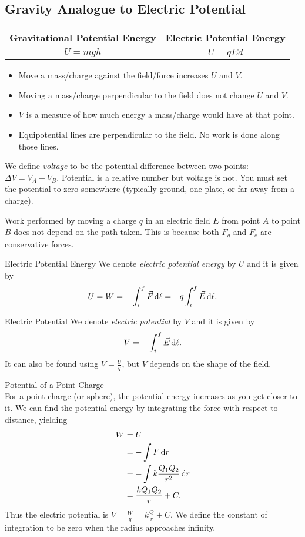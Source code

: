 \documentclass[class=article, crop=false]{standalone}
\begin{document}
  \subsection{Gravity Analogue to Electric Potential}
  \begin{center}\begin{tabular}{c|c}
    Gravitational Potential Energy & Electric Potential Energy \\
    \hline
    $U = mgh$ & $U = qEd$
  \end{tabular}\end{center}
  \begin{itemize}
    \item Move a mass/charge against the field/force increases $U$ and $V$.
    \item Moving a mass/charge perpendicular to the field does not change $U$ and $V$.
    \item $V$ is a measure of how much energy a mass/charge would have at that point.
    \item Equipotential lines are perpendicular to the field. No work is done along those lines.
  \end{itemize}
  We define \emph{voltage} to be the potential difference between two points: $\Delta V = V_A - V_B$. Potential is a relative number but voltage is not. You must set the potential to zero somewhere (typically ground, one plate, or far away from a charge).
  \begin{note}{}
    Work performed by moving a charge $q$ in an electric field $E$ from point $A$ to point $B$ does not depend on the path taken. This is because both $F_g$ and $F_e$ are conservative forces.
  \end{note}
  \begin{definition}{Electric Potential Energy}
    We denote \emph{electric potential energy} by $U$ and it is given by
    \[
      U = W = -\int_{i}^{f}\vec{F} \,\mathrm{d}\ell = -q \int_{i}^{f}\vec{E} \,\mathrm{d}\ell.
    \]
  \end{definition}
  \begin{definition}{Electric Potential}
    We denote \emph{electric potential} by $V$ and it is given by
    \[
      V = -\int_{i}^{f}\vec{E} \,\mathrm{d}\ell.
    \]
    It can also be found using $V = \frac{U}{q}$, but $V$ depends on the shape of the field.
  \end{definition}
  \begin{example}{Potential of a Point Charge} \\
    For a point charge (or sphere), the potential energy increases as you get closer to it. We can find the potential energy by integrating the force with respect to distance, yielding
    \begin{align*}
      W &= U \\
        &= -\int F\,\mathrm{d}r \\
        &= -\int k\frac{Q_1Q_2}{r^2}\,\mathrm{d}r \\
        &= \frac{kQ_1Q_2}{r} + C.
    \end{align*}
    Thus the electric potential is $V = \frac{W}{q} = k\frac{Q}{r} + C$. We define the constant of integration to be zero when the radius approaches infinity.
  \end{example}
\end{document}

